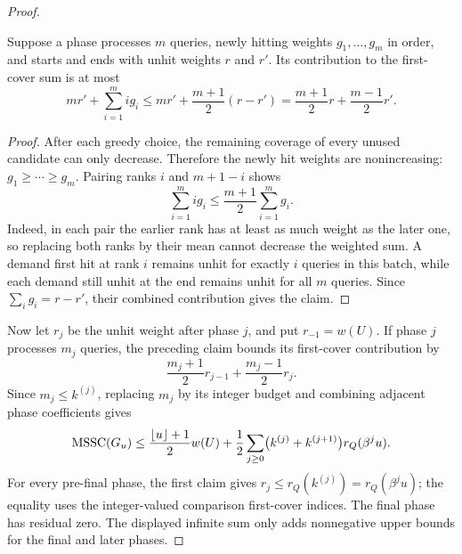 \begin{proof}
\begin{claim}
Suppose a phase processes $m$ queries, newly hitting weights
$g_1,\ldots,g_m$ in order, and starts and ends with unhit weights
$r$ and $r'$. Its contribution to the first-cover sum is at most
\[
 mr'+\sum_{i=1}^m i g_i
 \le mr'+\frac{m+1}{2}(r-r')
 =\frac{m+1}{2}r+\frac{m-1}{2}r'.
\]
\end{claim}
\begin{proof}
After each greedy choice, the remaining coverage of every unused
candidate can only decrease. Therefore the newly hit weights are
nonincreasing: $g_1\ge\cdots\ge g_m$. Pairing ranks $i$ and
$m+1-i$ shows
\[
 \sum_{i=1}^m i g_i\le\frac{m+1}{2}\sum_{i=1}^m g_i.
\]
Indeed, in each pair the earlier rank has at least as much weight
as the later one, so replacing both ranks by their mean cannot
decrease the weighted sum. A demand first hit at rank $i$ remains
unhit for exactly $i$ queries in this batch, while each demand
still unhit at the end remains unhit for all $m$ queries. Since
$\sum_i g_i=r-r'$, their combined contribution gives the claim.
\end{proof}

Now let $r_j$ be the unhit weight after phase $j$, and put
$r_{-1}=w(U)$. If phase $j$ processes $m_j$ queries, the preceding
claim bounds its first-cover contribution by
\[
 \frac{m_j+1}{2}r_{j-1}+\frac{m_j-1}{2}r_j.
\]
Since $m_j\le k^{(j)}$, replacing $m_j$ by its integer budget and
combining adjacent phase coefficients gives
\[
 \operatorname{MSSC}(G_u)\le
 \frac{\lfloor u\rfloor+1}{2}w(U)
 +\frac12\sum_{j\ge0}
       \bigl(k^{(j)}+k^{(j+1)}\bigr)r_Q(\beta^ju).
\]
For every pre-final phase, the first claim gives
$r_j\le r_Q(k^{(j)})=r_Q(\beta^ju)$; the equality uses the
integer-valued comparison first-cover indices. The final phase
has residual zero. The displayed infinite sum only adds
nonnegative upper bounds for the final and later phases.


\end{proof}
